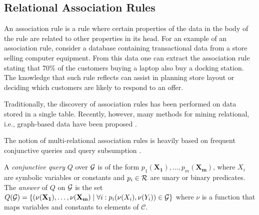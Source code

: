 

\subsection{Relational Association Rules}
\label{subsec:assoc_rule}
An association rule is a rule where certain properties of the data in the body of
the rule are related to other properties in its head. For an example of an association rule, consider a
database containing transactional data from a store selling computer equipment.
From this data one can extract the association rule stating that 70\% of the customers
buying a laptop also buy a docking station. The knowledge that such rule reflects 
can assist in planning store layout or deciding which customers are likely to respond to an
offer.

Traditionally, the discovery of association rules  has been performed on data stored in a single table.
Recently, however, many methods for mining relational, i.e., graph-based data have been
proposed \cite{DBLP:books/daglib/0021868}.

The notion of multi-relational association rules is heavily based on frequent conjunctive queries and query subsumption \cite{warmer}. 

\begin{definition}
A \emph{conjunctive query} $Q$ over $\mathcal{G}$ is of the form $p_1(\mathbf{X_1}),\dotsc,p_m(\mathbf{X_m})$, where $X_i$ are symbolic variables or constants and $p_i \in \mathcal{R}$ are unary or binary predicates. The \emph{answer} of $Q$ on $\mathcal{G}$ is the set $Q(\mathcal{G}) = \{ (\nu(\mathbf{X_1}), \dotsc, \nu(\mathbf{X_m}) \mid \forall i: p_i(\nu(X_i), \nu(Y_i)) \in \mathcal{G} \}$ where $\nu$ is a function that maps variables and constants to elements of $\mathcal{C}$.
\end{definition}

